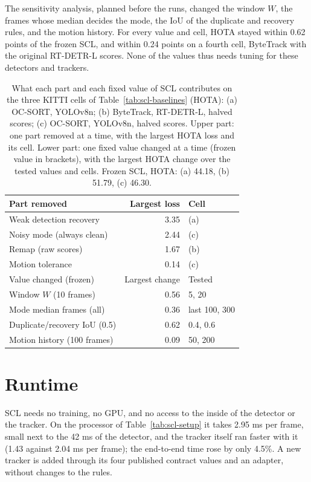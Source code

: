 The sensitivity analysis, planned before the runs, changed the window $W$, the frames whose median decides the mode, the IoU of the duplicate and recovery rules, and the motion history. For every value and cell, HOTA stayed within 0.62 points of the frozen SCL, and within 0.24 points on a fourth cell, ByteTrack with the original RT-DETR-L scores. None of the values thus needs tuning for these detectors and trackers.

\begin{table}[tbp]
\centering
\caption{What each part and each fixed value of SCL contributes on the three KITTI cells of Table~\ref{tab:scl-baselines} (HOTA): (a) OC-SORT, YOLOv8n; (b) ByteTrack, RT-DETR-L, halved scores; (c) OC-SORT, YOLOv8n, halved scores. Upper part: one part removed at a time, with the largest HOTA loss and its cell. Lower part: one fixed value changed at a time (frozen value in brackets), with the largest HOTA change over the tested values and cells. Frozen SCL, HOTA: (a) 44.18, (b) 51.79, (c) 46.30.}
\label{tab:scl-parts}
\begin{tabular}{lrl}
\toprule
Part removed & Largest loss & Cell\\
\midrule
Weak detection recovery & 3.35 & (a)\\
Noisy mode (always clean) & 2.44 & (c)\\
Remap (raw scores) & 1.67 & (b)\\
Motion tolerance & 0.14 & (c)\\
\midrule
Value changed (frozen) & Largest change & Tested\\
\midrule
Window $W$ (10 frames) & 0.56 & 5, 20\\
Mode median frames (all) & 0.36 & last 100, 300\\
Duplicate/recovery IoU (0.5) & 0.62 & 0.4, 0.6\\
Motion history (100 frames) & 0.09 & 50, 200\\
\bottomrule
\end{tabular}
\end{table}

\section{Runtime}\label{sec:scl-runtime}
SCL needs no training, no GPU, and no access to the inside of the detector or the tracker. On the processor of Table~\ref{tab:scl-setup} it takes 2.95 ms per frame, small next to the 42 ms of the detector, and the tracker itself ran faster with it (1.43 against 2.04 ms per frame); the end-to-end time rose by only 4.5\%. A new tracker is added through its four published contract values and an adapter, without changes to the rules.

